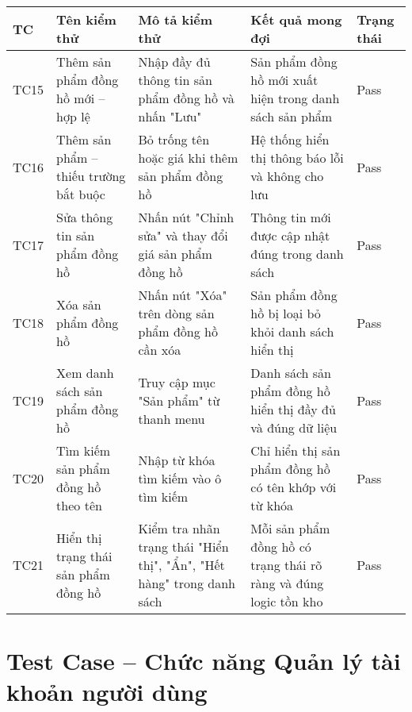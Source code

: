 \begin{longtable}{|p{1cm}|p{3cm}|p{4cm}|p{3cm}|p{2cm}|}
\hline
\textbf{TC} & \textbf{Tên kiểm thử} & \textbf{Mô tả kiểm thử} & \textbf{Kết quả mong đợi} & \textbf{Trạng thái} \\
\hline
TC15 & Thêm sản phẩm đồng hồ mới – hợp lệ & Nhập đầy đủ thông tin sản phẩm đồng hồ và nhấn "Lưu" & Sản phẩm đồng hồ mới xuất hiện trong danh sách sản phẩm & Pass \\
\hline
TC16 & Thêm sản phẩm – thiếu trường bắt buộc & Bỏ trống tên hoặc giá khi thêm sản phẩm đồng hồ & Hệ thống hiển thị thông báo lỗi và không cho lưu & Pass \\
\hline
TC17 & Sửa thông tin sản phẩm đồng hồ & Nhấn nút "Chỉnh sửa" và thay đổi giá sản phẩm đồng hồ & Thông tin mới được cập nhật đúng trong danh sách & Pass \\
\hline
TC18 & Xóa sản phẩm đồng hồ & Nhấn nút "Xóa" trên dòng sản phẩm đồng hồ cần xóa & Sản phẩm đồng hồ bị loại bỏ khỏi danh sách hiển thị & Pass \\
\hline
TC19 & Xem danh sách sản phẩm đồng hồ & Truy cập mục "Sản phẩm" từ thanh menu & Danh sách sản phẩm đồng hồ hiển thị đầy đủ và đúng dữ liệu & Pass \\
\hline
TC20 & Tìm kiếm sản phẩm đồng hồ theo tên & Nhập từ khóa tìm kiếm vào ô tìm kiếm & Chỉ hiển thị sản phẩm đồng hồ có tên khớp với từ khóa & Pass \\
\hline
TC21 & Hiển thị trạng thái sản phẩm đồng hồ & Kiểm tra nhãn trạng thái "Hiển thị", "Ẩn", "Hết hàng" trong danh sách & Mỗi sản phẩm đồng hồ có trạng thái rõ ràng và đúng logic tồn kho & Pass \\
\hline
\end{longtable}

\section*{Test Case – Chức năng Quản lý tài khoản người dùng}

